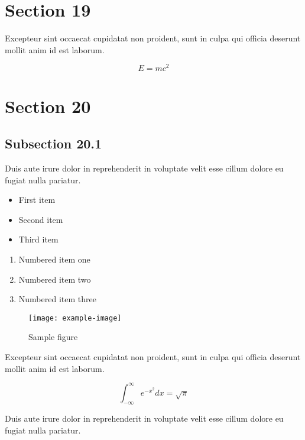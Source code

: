 \documentclass{article}
\begin{document}
\section{Section 19}


Excepteur sint occaecat cupidatat non proident, sunt in culpa qui officia deserunt mollit anim id est laborum.

\begin{equation}
    E = mc^2
\end{equation}

\section{Section 20}

\subsection{Subsection 20.1}

Duis aute irure dolor in reprehenderit in voluptate velit esse cillum dolore eu fugiat nulla pariatur.

\begin{itemize}
\item First item
\item Second item
\item Third item
\end{itemize}

\begin{enumerate}
\item Numbered item one
\item Numbered item two
\item Numbered item three
\end{enumerate}

\begin{figure}[h]
    \centering
    \texttt{[image: example-image]}
    \caption{Sample figure}
    \label{fig:sample}
\end{figure}

Excepteur sint occaecat cupidatat non proident, sunt in culpa qui officia deserunt mollit anim id est laborum.

\begin{equation}
    \int_{-\infty}^{\infty} e^{-x^2} dx = \sqrt{\pi}
\end{equation}

Duis aute irure dolor in reprehenderit in voluptate velit esse cillum dolore eu fugiat nulla pariatur.
\end{document}
